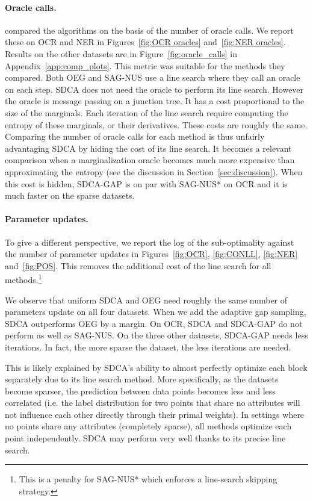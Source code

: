 \paragraph{Oracle calls.}
\citet{schmidt2015non} compared the algorithms on the basis of the number of oracle calls.
We report these on OCR and NER in Figures~\ref{fig:OCR oracles} and~\ref{fig:NER oracles}.
Results on the other datasets are in Figure~\ref{fig:oracle_calls} in Appendix~\ref{app:comp_plots}.
This metric was suitable for the methods they compared.
Both OEG and SAG-NUS use a line search where they call an oracle on each step.
SDCA does not need the oracle to perform its line search.
However the oracle is message passing on a junction tree.
It has a cost proportional to the size of the marginals.
Each iteration of the line search require computing the entropy of these marginals, or their derivatives.
These costs are roughly the same.
Comparing the number of oracle calls for each method is thus unfairly advantaging SDCA by hiding the cost of its line search.
It becomes a relevant comparison when a marginalization oracle becomes much more expensive than approximating the entropy (see the discussion in Section~\ref{sec:discussion}).
When this cost is hidden, SDCA-GAP is on par with SAG-NUS* on OCR and it is much faster on the sparse datasets.

\paragraph{Parameter updates.}
To give a different perspective, we report the log of the sub-optimality against the number of parameter updates in Figures~\ref{fig:OCR}, \ref{fig:CONLL}, \ref{fig:NER} and~\ref{fig:POS}.
This removes the additional cost of the line search for all methods.\footnote{
This is a penalty for SAG-NUS* which enforces a line-search skipping strategy.
}

We observe that uniform SDCA and OEG need roughly the same number of  parameters update on all four datasets.
When we add the adaptive gap sampling, SDCA outperforms OEG by a margin.
On OCR, SDCA and SDCA-GAP do not perform as well as SAG-NUS.
On the three other datasets, SDCA-GAP needs less iterations.
In fact, the more sparse the dataset, the less iterations are needed.

This is likely explained by SDCA's ability to almost perfectly optimize each block separately due to its line search method.
More specifically, as the datasets become sparser, the prediction between data points becomes less and less correlated (i.e. the label distribution for two points that share no attributes will not influence each other directly through their primal weights).
In settings where no points share any attributes (completely sparse), all methods optimize each point independently.
SDCA  may perform very well thanks to its precise line search.

